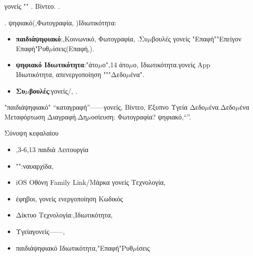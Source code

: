 \begin{tcbinfo}{γονείς ""}
. Βίντεο. .

\end{tcbinfo}


. ψηφιακό(,Φωτογραφία, )Ιδιωτικότητα:

\begin{itemize}
  \item \textbf{παιδιάψηφιακό}:,Κοινωνικό, Φωτογραφία, .Συ$\mu$βουλές γονείς "Επαφή""Επείγον Επαφή"Ρυθ$\mu$ίσεις(Επαφή,).
  \item \textbf{ψηφιακό Ιδιωτικότητα}:"άτο$\mu$ο",14 άτο$\mu$ο, Ιδιωτικότητα.γονείς App Ιδιωτικότητα, απενεργοποίηση """Δεδο$\mu$ένα".
  \item \textbf{Συ$\mu$βουλές}:γονείς/, .
\end{itemize}

\begin{tcbwarn}{"παιδιάψηφιακό"}
“καταγραφή”——γονείς, Βίντεο, Έξυπνο Υγεία Δεδο$\mu$ένα.Δεδο$\mu$ένα Μεταφόρτωση Διαγραφή.Δη$\mu$οσίευση: Φωτογραφία? ψηφιακό,“”.

\end{tcbwarn}

\begin{tcbsummary}{Σύνοψη κεφαλαίου}
\begin{itemize}
  \item ,3-6,13 παιδιά Λειτουργία
  \item "":ναυαρχίδα,
  \item iOS Οθόνη Family Link/Μάρκα γονείς Τεχνολογία,
  \item έφηβοι, γονείς ενεργοποίηση Κωδικός
  \item Δίκτυο Τεχνολογία:,Ιδιωτικότητα,
  \item Υγείαγονείς——,
  \item παιδιάψηφιακό Ιδιωτικότητα,"Επαφή"Ρυθ$\mu$ίσεις
\end{itemize}

\end{tcbsummary}
